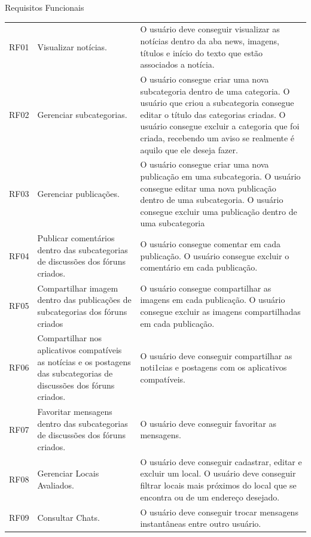 \begin{quadro}[htb]
	\centering
	\ABNTEXfontereduzida
	\caption[Requisitos Funcionais]{Requisitos Funcionais}
	\label{tabela-requisitos-funcionais}
\end{quadro}
\begin{longtable}{|p{2.0cm}|p{6.5cm}|p{6.5cm}|}
	\hline
	\thead{Código} & \thead{Requisito}  & \thead{Descrição} \\
	\hline
	RF01 &Visualizar notícias.  & O usuário deve conseguir visualizar as notícias dentro da aba news, imagens, títulos e início do texto que estão associados a notícia.\\
	\hline
	RF02 & Gerenciar subcategorias. &
	O usuário consegue criar uma nova subcategoria dentro de uma categoria.
	O usuário que criou a subcategoria consegue editar o título das categorias criadas.
	O usuário consegue excluir a categoria que foi criada, recebendo um aviso se realmente é aquilo que ele deseja fazer.
	\\
	\hline
	RF03 & Gerenciar publicações.   & O usuário consegue criar uma nova publicação em uma subcategoria. 
	O usuário consegue editar uma nova publicação dentro de uma subcategoria. 
	O usuário consegue excluir uma publicação dentro de uma subcategoria\\
	\hline
	RF04 & Publicar comentários dentro das subcategorias de discussões dos fóruns criados. & O usuário consegue comentar em cada publicação. O usuário consegue excluir o comentário em cada publicação. \\
	\hline
	RF05 & Compartilhar imagem dentro das publicações de subcategorias dos fóruns criados &
	O usuário consegue compartilhar as imagens em cada publicação. O usuário consegue excluir as imagens compartilhadas em cada publicação.\\
	\hline
	RF06 & Compartilhar nos aplicativos compatíveis as notícias e os postagens das subcategorias de discussões dos fóruns criados.  & O usuário deve conseguir compartilhar as noti1cias e postagens com os aplicativos compatíveis.\\
	\hline
	RF07 & Favoritar mensagens dentro das subcategorias de discussões dos fóruns criados. & O usuário deve conseguir favoritar as mensagens. \\
	\hline
	RF08 & Gerenciar Locais Avaliados. & O usuário deve conseguir cadastrar, editar e excluir um local. O usuário deve conseguir filtrar locais mais próximos do local que se encontra ou de um endereço desejado. \\
	\hline
	RF09 & Consultar Chats.   &O usuário deve conseguir trocar mensagens instantâneas entre outro usuário.\\

\end{longtable}
